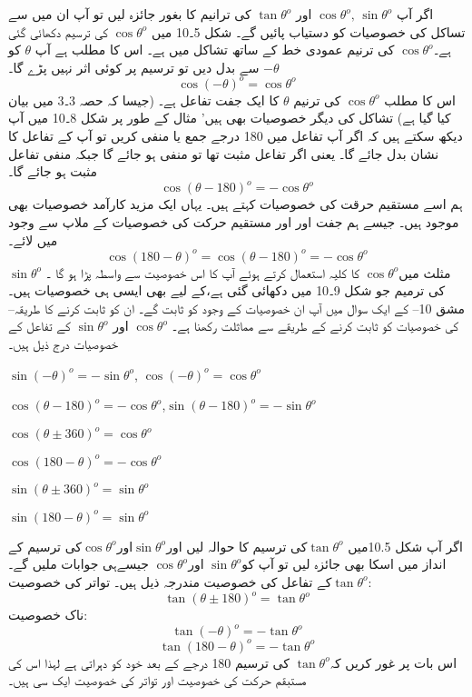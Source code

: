 اگر آپ \( \cos \theta^o, \,\sin \theta^o \) اور  \(\tan \theta^o\) کی ترانیم کا بغور جائزہ لیں تو آپ ان میں سے تساکل کی خصوصیات کو دستیاب پائیں گے۔ شکل 5۔10 میں \(\cos \theta^o\) کی ترسیم دکھائی گئی ہے۔\(\cos \theta^o\)  کی ترنیم عمودی خط کے ساتھ تشاکل میں ہے۔ اس کا مطلب ہے آپ \(\theta\) کو \(-\theta\) سے بدل دیں تو  ترسیم پر کوئی اثر نہیں پڑے گا۔
\[ \cos (-\theta)^o = \cos \theta^o \]
اس کا مطلب \(\cos \theta^o\) کی ترنیم \(\theta\)
 کا ایک جفت تفاعل ہے۔ (جیسا کہ حصہ 3۔3 میں بیان کیا گیا ہے) 
تشاکل کی دیگر خصوصیات بھی ہیں' مثال کے طور پر شکل 8۔10 میں آپ دیکھ سکتے ہیں کہ اگر آپ تفاعل میں 180 درجے جمع یا منفی کریں تو آپ کے تفاعل کا نشان بدل جائے گا۔ یعنی اگر تفاعل مثبت تھا تو منفی ہو جائے گا جبکہ منفی تفاعل مثبت ہو جائے گا۔
\[\cos (\theta -180)^o =-\cos \theta^o\]
 ہم اسے مستقیم حرقت کی خصوصیات کہتے ہیں۔ 
یہاں ایک مزید کارآمد خصوصیات بھی موجود ہیں۔ جیسے ہم جفت اور اور مستقیم حرکت کی خصوصیات کے ملاپ سے وجود میں لائے۔
\[\cos (180 - \theta)^o =\cos (\theta -180)^o=-\cos \theta^o\]
مثلث میں\(\cos \theta^o\) کا کلیہ استعمال کرتے ہوئے آپ کا اس خصوصیت سے واسطہ پڑا ہو گا ۔   \(\sin \theta^o\) کی ترمیم جو شکل 9۔10 میں دکھائی گئی ہے،کے لیے بھی ایسی ہی خصوصیات ہیں۔ مشق 10-- کے ایک سوال میں آپ ان خصوصیات کے وجود کو ثابت گے۔ ان کو ثابت کرنے کا طریقہ-- کی خصوصیات کو ثابت کرنے کے طریقے سے مماثلت رکھنا ہے۔  \(\cos \theta^o\)   اور  \(\sin \theta^o\)
 کے تفاعل کے خصوصیات درج ذیل ہیں۔
\begin{description}
\item [تواتر کی خصوصیات] \( \sin (-\theta)^o= -\sin \theta^o \), \(\cos (-\theta)^o= \cos \theta^o\)
\item [تاک کی خصوصیات] \(\cos (\theta -180)^o=-\cos \theta^o\),\(\sin (\theta - 180)^o=-\sin \theta^o\)
\item [مستقیم حرکت کی خصوصیات]
\item \(\cos ( \theta \pm 360)^o=\cos \theta^o\)
\item \( \cos (180- \theta)^o=-\cos \theta^o\)
\item  \(\sin (\theta \pm 360)^o=\sin \theta^o \)
\item \( \sin (180-\theta )^o=\sin \theta^o\)
\end{description}



اگر آپ شکل 10.5میں \(\tan \theta^o\)کی ترسیم کا حوالہ لیں اور\(\sin \theta^o\)اور\(\cos \theta^o\)کی ترسیم کے انداز میں اسکا بھی جائزہ لیں تو آپ کو\(\sin \theta^o\) اور\(\cos \theta^o\) جیسےہی جوابات ملیں گے۔
\(\tan \theta^o\)کے تفاعل کی خصوصیت مندرجہ ذیل ہیں۔
تواتر کی خصوصیت:   \begin{equation*}
\tan (\theta \pm 180)^o=\tan \theta^o
\end{equation*} 
ناک خصوصیت: 
 \begin{equation*}
 \tan (-\theta)^o=-\tan \theta^o 
\end{equation*}
 \begin{equation*}
 \tan (180 -\theta)^o=-\tan \theta^o
\end{equation*}
اس بات پر غور کریں کہ\(\tan \theta^o\) کی ترسیم 180 درجے کے بعد خود کو دہراتی ہے لہذا اس کی مستبقم حرکت کی  خصوصیت اور تواتر کی خصوصیت ایک سی ہیں۔

